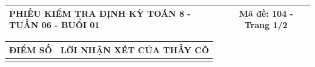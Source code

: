 \documentclass[12pt,a4paper]{article}
\begin{document}
\newpage


\noindent
\begin{tabularx}{\linewidth}{|X|c|}
\hline
\textbf{PHIẾU KIỂM TRA ĐỊNH KỲ TOÁN 8 - TUẦN 06 - BUỔI 01} & \textbf{Mã đề: 104 - Trang 1/2} \\
\hline
\end{tabularx}

\vspace{1mm}

\noindent
\begin{tabularx}{\linewidth}{|p{3.2cm}|X|}
\hline
\centering\textbf{ĐIỂM SỐ} & \centering\textbf{LỜI NHẬN XÉT CỦA THẦY CÔ} \tabularnewline
\hline
\rule{0pt}{1.8cm} & \tabularnewline
\hline
\end{tabularx}

\vspace{1.2mm}
\end{document}
